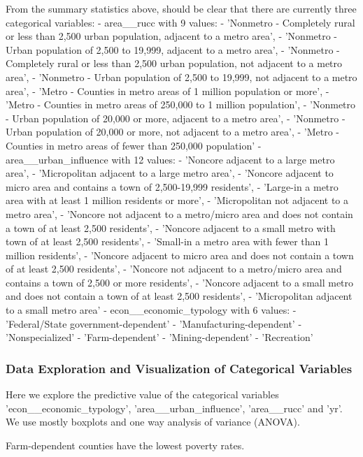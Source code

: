 \documentclass[11pt]{article}
\begin{document}
    From the summary statistics above, should be clear that there are
currently three categorical variables: - area\_\_rucc with 9 values: -
'Nonmetro - Completely rural or less than 2,500 urban population,
adjacent to a metro area', - 'Nonmetro - Urban population of 2,500 to
19,999, adjacent to a metro area', - 'Nonmetro - Completely rural or
less than 2,500 urban population, not adjacent to a metro area', -
'Nonmetro - Urban population of 2,500 to 19,999, not adjacent to a metro
area', - 'Metro - Counties in metro areas of 1 million population or
more', - 'Metro - Counties in metro areas of 250,000 to 1 million
population', - 'Nonmetro - Urban population of 20,000 or more, adjacent
to a metro area', - 'Nonmetro - Urban population of 20,000 or more, not
adjacent to a metro area', - 'Metro - Counties in metro areas of fewer
than 250,000 population' - area\_\_urban\_influence with 12 values: -
'Noncore adjacent to a large metro area', - 'Micropolitan adjacent to a
large metro area', - 'Noncore adjacent to micro area and contains a town
of 2,500-19,999 residents', - 'Large-in a metro area with at least 1
million residents or more', - 'Micropolitan not adjacent to a metro
area', - 'Noncore not adjacent to a metro/micro area and does not
contain a town of at least 2,500 residents', - 'Noncore adjacent to a
small metro with town of at least 2,500 residents', - 'Small-in a metro
area with fewer than 1 million residents', - 'Noncore adjacent to micro
area and does not contain a town of at least 2,500 residents', -
'Noncore not adjacent to a metro/micro area and contains a town of 2,500
or more residents', - 'Noncore adjacent to a small metro and does not
contain a town of at least 2,500 residents', - 'Micropolitan adjacent to
a small metro area' - econ\_\_economic\_typology with 6 values: -
'Federal/State government-dependent' - 'Manufacturing-dependent' -
'Nonspecialized' - 'Farm-dependent' - 'Mining-dependent' - 'Recreation'

    \subsubsection{Data Exploration and Visualization of Categorical
Variables}\label{data-exploration-and-visualization-of-categorical-variables}

Here we explore the predictive value of the categorical variables
'econ\_\_economic\_typology', 'area\_\_urban\_influence', 'area\_\_rucc'
and 'yr'. We use mostly boxplots and one way analysis of variance
(ANOVA).

    Farm-dependent counties have the lowest poverty rates.
\end{document}
